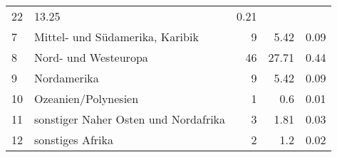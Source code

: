 \begin{longtable}{lXrrr}
       \num{22} &
       \num[round-mode=places,round-precision=2]{13,25} &
         \num[round-mode=places,round-precision=2]{0,21} \\

     7 &
     \multicolumn{1}{X}{ Mittel- und Südamerika, Karibik   } &


       \num{9} &
       \num[round-mode=places,round-precision=2]{5,42} &
         \num[round-mode=places,round-precision=2]{0,09} \\

     8 &
     \multicolumn{1}{X}{ Nord- und Westeuropa   } &


       \num{46} &
       \num[round-mode=places,round-precision=2]{27,71} &
         \num[round-mode=places,round-precision=2]{0,44} \\

     9 &
     \multicolumn{1}{X}{ Nordamerika   } &


       \num{9} &
       \num[round-mode=places,round-precision=2]{5,42} &
         \num[round-mode=places,round-precision=2]{0,09} \\

     10 &
     \multicolumn{1}{X}{ Ozeanien/Polynesien   } &


       \num{1} &
       \num[round-mode=places,round-precision=2]{0,6} &
         \num[round-mode=places,round-precision=2]{0,01} \\

     11 &
     \multicolumn{1}{X}{ sonstiger Naher Osten und Nordafrika   } &


       \num{3} &
       \num[round-mode=places,round-precision=2]{1,81} &
         \num[round-mode=places,round-precision=2]{0,03} \\

     12 &
     \multicolumn{1}{X}{ sonstiges Afrika   } &


       \num{2} &
       \num[round-mode=places,round-precision=2]{1,2} &
         \num[round-mode=places,round-precision=2]{0,02} \\


\end{longtable}
